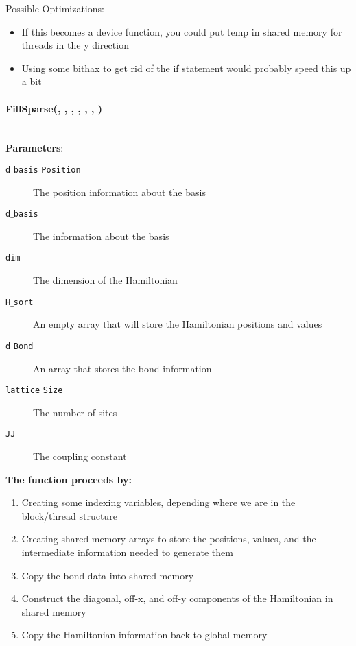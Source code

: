 \documentclass{article}
\begin{document}
Possible Optimizations:
\begin{itemize}
\item{If this becomes a device function, you could put temp in shared memory for threads in the y direction}
\item{Using some bithax to get rid of the if statement would probably speed this up a bit}
\end{itemize}

\paragraph{\cudaglobal \void FillSparse(\ptrint , \ptrint , \int, \hamstruct, \int , \int , \const \double ) \\ \\ }
\noindent\textbf{Parameters}:
\begin{description}
\item[\ptrint \texttt{d$\_$basis$\_$Position}] The position information about the basis
\item[\ptrint \texttt{d$\_$basis}] The information about the basis
\item[\int \texttt{dim}] The dimension of the Hamiltonian
\item[\cuDoubleComplex \texttt{H$\_$sort}] An empty array that will store the Hamiltonian positions and values
\item[\int \texttt{d$\_$Bond}] An array that stores the bond information
\item[\int \texttt{lattice$\_$Size}] The number of sites
\item[\const \double \texttt{JJ}] The coupling constant
\end{description}

\noindent\textbf{The function proceeds by:}
\begin{enumerate}
\item{Creating some indexing variables, depending where we are in the block/thread structure}
\item{Creating shared memory arrays to store the positions, values, and the intermediate information needed to generate them}
\item{Copy the bond data into shared memory}
\item{Construct the diagonal, off-x, and off-y components of the Hamiltonian in shared memory}
\item{Copy the Hamiltonian information back to global memory}
\end{enumerate}
\end{document}
